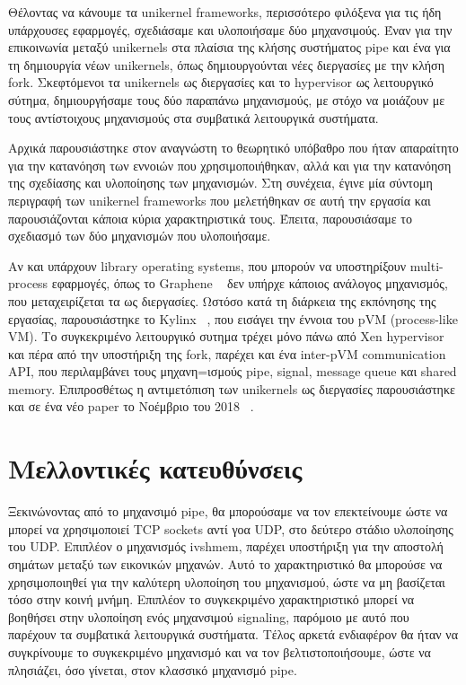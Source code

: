 Θέλοντας να κάνουμε τα unikernel frameworks, περισσότερο φιλόξενα για τις ήδη
υπάρχουσες εφαρμογές, σχεδιάσαμε και υλοποιήσαμε δύο μηχανσιμούς. Έναν για την
επικοινωνία μεταξύ unikernels στα πλαίσια της κλήσης συστήματος pipe και ένα για
τη δημιουργία νέων unikernels, όπως δημιουργούνται νέες διεργασίες με την κλήση
fork. Σκεφτόμενοι τα unikernels ως διεργασίες και το hypervisor ως λειτουργικό
σύτημα, δημιουργήσαμε τους δύο παραπάνω μηχανισμούς, με στόχο να μοιάζουν με
τους αντίστοιχους μηχανισμούς στα συμβατικά λειτουργικά συστήματα.

Αρχικά παρουσιάστηκε στον αναγνώστη το θεωρητικό υπόβαθρο που ήταν απαραίτητο
για την κατανόηση των εννοιών που χρησιμοποιήθηκαν, αλλά και για την κατανόηση
της σχεδίασης και υλοποίησης των μηχανισμών. Στη συνέχεια, έγινε μία σύντομη
περιγραφή των unikernel frameworks που μελετήθηκαν σε αυτή την εργασία και
παρουσιάζονται κάποια κύρια χαρακτηριστικά τους. Έπειτα, παρουσιάσαμε το
σχεδιασμό των δύο μηχανισμών που υλοποιήσαμε. 

Αν και υπάρχουν library operating systems, που μπορούν να υποστηρίξουν
multi-process εφαρμογές, όπως το Graphene ~\cite{tsai2014cooperation} δεν υπήρχε
κάποιος ανάλογος μηχανισμός, που μεταχειρίζεται τα  ως διεργασίες.
Ωστόσο κατά τη διάρκεια της εκπόνησης της εργασίας, παρουσιάστηκε το Kylinx
~\cite{zhang2018kylinx}, που εισάγει την έννοια του pVM (process-like VM). Το
συγκεκριμένο λειτουργικό συτημα τρέχει μόνο πάνω από Xen hypervisor και πέρα από
την υποστήριξη της fork, παρέχει και ένα inter-pVM communication API, που
περιλαμβάνει τους μηχανη=ισμούς pipe, signal, message queue και shared memory. 
Επιπροσθέτως η αντιμετόπιση των unikernels ως διεργασίες παρουσιάστηκε και σε ένα νέο paper το Νοέμβριο του 2018 ~\cite{williams2018unikernels}.

\section{Μελλοντικές κατευθύνσεις}
Ξεκινώνοντας από το μηχανσιμό pipe, θα μπορούσαμε να τον επεκτείνουμε ώστε να
μπορεί να χρησιμοποιεί TCP sockets αντί γοα UDP, στο δεύτερο στάδιο υλοποίησης
του UDP. Επιπλέον ο μηχανισμός ivshmem, παρέχει υποστήριξη για την αποστολή
σημάτων
μεταξύ των εικονικών μηχανών. Αυτό το χαρακτηριστικό θα μπορούσε να
χρησιμοποιηθεί για την καλύτερη υλοποίηση του μηχανισμού, ώστε να μη βασίζεται
τόσο στην κοινή μνήμη. Επιπλέον το συγκεκριμένο χαρακτηριστικό μπορεί να
βοηθήσει στην υλοποίηση ενός μηχανσιμού signaling, παρόμοιο με αυτό που παρέχουν
τα συμβατικά λειτουργικά συστήματα. Τέλος αρκετά ενδιαφέρον θα ήταν να
συγκρίνουμε το συγκεκριμένο μηχανισμό και να τον βελτιστοποιήσουμε, ώστε να
πλησιάζει, όσο γίνεται, στον κλασσικό μηχανισμό pipe.

